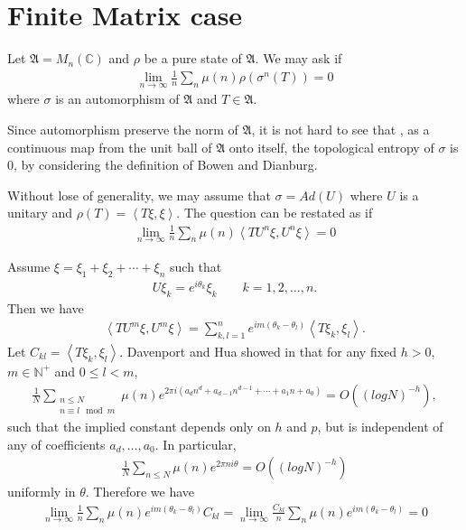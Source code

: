 \documentclass[a4paper,10pt]{amsart}
\newcommand{\AAA}{\mathfrak A}
\newcommand{\C}{\mathbb C} %
\newcommand{\N}{\mathbb N} %
\begin{document}
\section{Finite Matrix case}
Let $\AAA = M_n(\C)$ and $\rho$ be a pure state of $\AAA$. We may ask if 
\begin{align*}
    \lim_{n \rightarrow \infty}\frac{1}{n}\sum_{n}\mu(n)\rho(\sigma^{n}(T)) = 0
\end{align*}
where $\sigma$ is an automorphism of $\AAA$ and $T \in \AAA$.

Since automorphism preserve the norm of $\AAA$, it is not hard to see that 
, as a continuous map from the unit ball of $\AAA$ onto itself, the topological 
entropy of $\sigma$ is 0, by considering the definition of Bowen and Dianburg. 

Without lose of generality, we may assume that $\sigma = Ad(U)$ where $U$ is a
unitary and $\rho(T) = \left \langle T \xi, \xi \right \rangle$. The question 
can be restated as if
\begin{align*}
    \lim_{n \rightarrow \infty}\frac{1}{n}\sum_{n}\mu(n) \left \langle T U^{n}\xi, U^{n}\xi \right \rangle= 0
\end{align*}

Assume $\xi = \xi_1 + \xi_2 + \cdots + \xi_n$ such that 
\begin{align*}
    U \xi_k = e^{i\theta_k}\xi_k \qquad k = 1, 2, \ldots, n. 
\end{align*}
Then we have 
\begin{align*}
    \left \langle T U^{m}\xi, U^{m}\xi \right \rangle=
    \sum_{k,l = 1}^{n} e^{im(\theta_k-\theta_l)}\left \langle T \xi_k, \xi_l \right \rangle.
\end{align*}
Let $C_{kl} = \left \langle T \xi_k, \xi_l \right \rangle$. 
Davenport and Hua showed in \cite{Davenport37, Hua} that for any fixed $h > 0$,
$m \in \N^{+}$ and $0 \leq l < m$,
\begin{align} \label{HD} 
    \frac{1}{N}\sum_{\substack{n \leq N \\ n \equiv l \mod m }} 
    \mu(n)e^{2\pi i (a_{d}n^{d} + a_{d-1}n^{d-1} + \cdots + a_{1}n + a_{0})} = 
    O((logN)^{-h}), 
\end{align}
such that the implied constant depends only on $h$ and $p$, but is 
independent of any of coefficients $a_{d}, \ldots, a_{0}$.
In particular,
\begin{align*}
    \frac{1}{N} \sum_{n \leq N} \mu(n)e^{2\pi n i \theta} = O((logN)^{-h}) 
\end{align*}
uniformly in $\theta$. Therefore we have 
\begin{align*}
    \lim_{n \rightarrow \infty}\frac{1}{n}\sum_{n}\mu(n) e^{im(\theta_k-\theta_l)}C_{kl}
    = \lim_{n \rightarrow \infty}\frac{C_{kl}}{n}\sum_{n}\mu(n) e^{im(\theta_k-\theta_l)}
    = 0
\end{align*}
\end{document}
